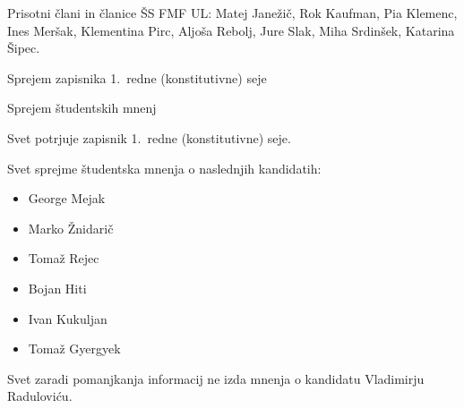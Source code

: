\documentclass{seja}
\begin{document}
Prisotni člani in članice ŠS FMF UL:
Matej Janežič,
Rok Kaufman,
Pia Klemenc,
Ines Meršak,
Klementina Pirc,
Aljoša Rebolj,
Jure Slak,
Miha Srdinšek,
Katarina Šipec.

\begin{red*}
	\item Sprejem zapisnika 1.~redne (konstitutivne) seje
	\item Sprejem študentskih mnenj
\end{red*}

\begin{ad}
	\item
	\begin{sklep*}
		Svet potrjuje zapisnik 1.~redne (konstitutivne) seje.
	\end{sklep*}

	\item
	\begin{sklep*}
		Svet sprejme študentska mnenja o naslednjih kandidatih:
		\begin{itemize}
				\item George Mejak
				\item Marko Žnidarič
				\item Tomaž Rejec
				\item Bojan Hiti
				\item Ivan Kukuljan
				\item Tomaž Gyergyek
		\end{itemize}

		Svet zaradi pomanjkanja informacij ne izda mnenja o kandidatu Vladimirju Raduloviću.
	\end{sklep*}
\end{ad}

\makeatletter \global\let\@enddocumenthook\@empty \makeatother
{}
\end{document}
